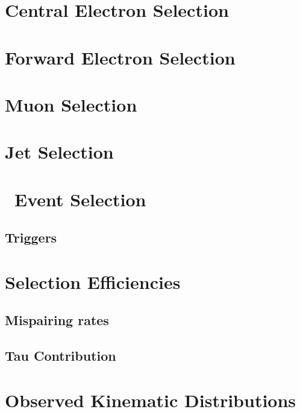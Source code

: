 \section{Central Electron Selection}

\section{Forward Electron Selection}

\section{Muon Selection}
\section{Jet Selection}
\section{\ZZ\ Event Selection}
\subsection{Triggers}
\section{Selection Efficiencies}
\subsection{\CZZ}
\subsection{Mispairing rates}
\subsection{Tau Contribution}
\section{Observed Kinematic Distributions}
